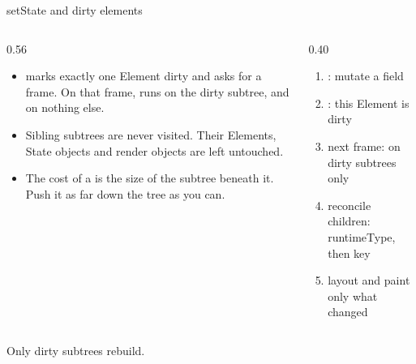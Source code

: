 \documentclass[10pt,aspectratio=169,t]{beamer}
\begin{document}
\begin{frame}[eyebrow=Rendering]{setState and dirty elements}
  \begin{columns}[T]
    \begin{column}{0.56\textwidth}
      \begin{itemize}
        \item {} marks exactly one Element dirty and asks for a frame. On that frame,  runs on the dirty subtree, and on nothing else.
        \item Sibling subtrees are never visited. Their Elements, State objects and render objects are left untouched.
        \item The cost of a  is the size of the subtree beneath it. Push it as far down the tree as you can.
      \end{itemize}
    \end{column}
    \begin{column}{0.40\textwidth}
      \begin{enumerate}
        \item {}: mutate a field
        \item {}: this Element is dirty
        \item next frame:  on dirty subtrees only
        \item reconcile children: runtimeType, then key
        \item layout and paint only what changed
      \end{enumerate}
    \end{column}
  \end{columns}
  \begin{takeaway}{Only dirty subtrees rebuild.}
  \end{takeaway}
\end{frame}
\end{document}
